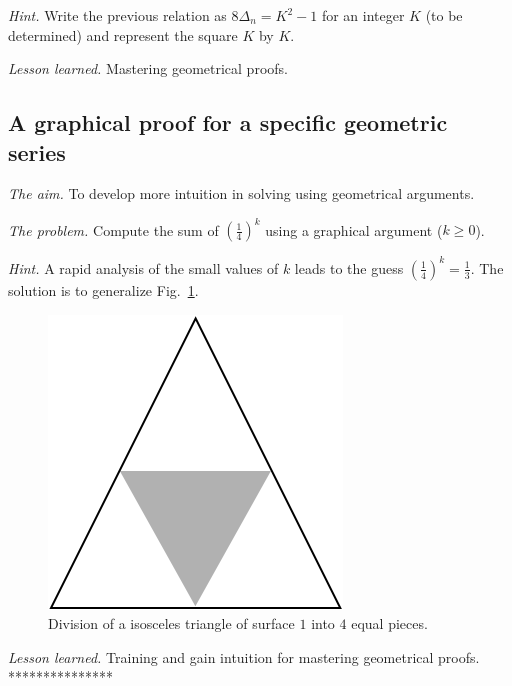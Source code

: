 {\noindent \textit{Hint.}
Write the previous relation as $8 \Delta_n = K^2 -1$
for an integer $K$ (to be determined) and represent the square $K$ by $K$. 
\medskip

\noindent \textit{Lesson learned.}
Mastering geometrical proofs.





\subsection{A graphical proof for a specific geometric series}

\noindent \textit{The aim.}
To develop more intuition in solving using geometrical arguments.
\medskip

\noindent \textit{The problem.}
Compute the sum of $(\frac{1}{4})^k$ using a graphical argument ($k \geq 0$).
\medskip

\noindent \textit{Hint.}
A rapid analysis of the small values of $k$ leads to the guess $(\frac{1}{4})^k = \frac{1}{3}$.
The solution is to generalize Fig.~\ref{fig:Sum1over4}.
 \begin{figure}[ht]
\begin{center}
       \includegraphics[scale=0.4]{FiguresMaths/Sum1over4}
\caption{Division of a isosceles triangle of surface $1$ into $4$ equal pieces.}
       \label{fig:Sum1over4}
\end{center}
\end{figure}
\medskip

\noindent \textit{Lesson learned.}
Training and gain intuition for mastering geometrical proofs. 
***************}
